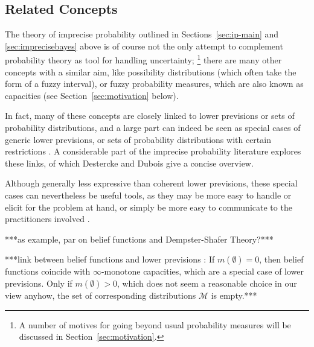 \subsection{Related Concepts}
\label{sec:ip-related}


The theory of imprecise probability outlined in Sections~\ref{sec:ip-main} and \ref{sec:imprecisebayes} above
is of course not the only attempt to complement probability theory as tool for handling uncertainty;%
\footnote{A number of motives for going beyond usual probability measures will be discussed in Section~\ref{sec:motivation}.}
there are many other concepts with a similar aim,
like possibility distributions (which often take the form of a fuzzy interval),
or fuzzy probability measures, which are also known as capacities (see Section~\ref{sec:motivation} below).

In fact, many of these concepts are closely linked to
lower previsions or sets of probability distributions,
and a large part can indeed be seen as special cases of generic lower previsions, 
or sets of probability distributions with certain restrictions
\parencite[Fig.~5.5]{itip-special}.
A considerable part of the imprecise probability literature
explores these links, of which Destercke and Dubois \parencite*{itip-other,itip-special}
give a concise overview.


Although generally less expressive than coherent lower previsions,
these special cases can nevertheless be useful tools,
as they may be more easy to handle or elicit for the problem at hand,
or simply be more easy to communicate to the practitioners involved
\parencite[\S 1]{itip-special}.


***as example, par on belief functions and Dempster-Shafer Theory?*** \parencite[\S 2]{itip-other}

***link between belief functions and lower previsions \parencite[\S 2.1, p~126]{itip-other}:
If $m(\emptyset) = 0$, then belief functions coincide with $\infty$-monotone capacities,
which are a special case of lower previsions.
Only if $m(\emptyset) > 0$, which does not seem a reasonable choice in our view anyhow,
the set of corresponding distributions $\mathcal{M}$ is empty.***



